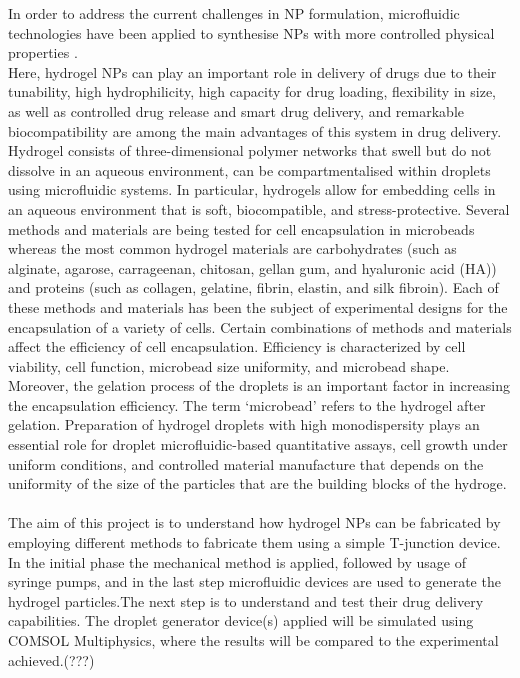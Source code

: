 In order to address the current challenges in NP formulation, microfluidic technologies have been applied to synthesise NPs with more controlled physical properties \parencite{xin2019}.
\\
Here, hydrogel NPs can play an important role in delivery of drugs due to their tunability, high hydrophilicity, high capacity for drug loading, flexibility in size, as well as controlled drug release and smart drug delivery, and remarkable biocompatibility are among the main advantages of this system in drug delivery. 
\\
Hydrogel consists of three-dimensional polymer networks that swell but do not dissolve in an aqueous environment, can be compartmentalised within droplets using microfluidic systems. In particular, hydrogels allow for embedding cells in an aqueous environment that is soft, biocompatible, and stress-protective. Several methods and materials are being tested for cell encapsulation in microbeads whereas the most common hydrogel materials are carbohydrates (such as alginate, agarose, carrageenan, chitosan, gellan gum, and hyaluronic acid (HA)) and proteins (such as collagen, gelatine, fibrin, elastin, and silk fibroin). Each of these methods and materials has been the subject of experimental designs for the encapsulation of a variety of cells. Certain combinations of methods and materials affect the efficiency of cell encapsulation. Efficiency is characterized by cell viability, cell function, microbead size uniformity, and microbead shape. Moreover, the gelation process of the droplets is an important factor in increasing the encapsulation efficiency. The term ‘microbead’ refers to the hydrogel after gelation. Preparation of hydrogel droplets with high monodispersity plays an essential role for droplet microfluidic-based quantitative assays, cell growth under uniform conditions, and controlled material manufacture that depends on the uniformity of the size of the particles that are the building blocks of the hydroge. \parencite{2020,Rashid2019,Nicodemus2008,Vasile2020,Shintaku2006,}
\\
\\
The aim of this project is to understand how hydrogel NPs can be fabricated by employing different methods to fabricate them using a simple T-junction device. In the initial phase the mechanical method is applied, followed by usage of syringe pumps, and in the last step microfluidic devices are used to generate the hydrogel particles.The next step is to understand and test their drug delivery capabilities. The droplet generator device(s) applied will be simulated using COMSOL Multiphysics, where the results will be compared to the experimental achieved.(???)